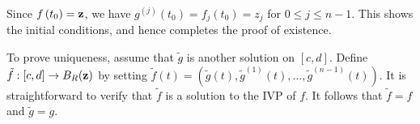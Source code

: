 \documentclass[a4paper]{article}
\begin{document}
Since $f\left(t_0\right)={\bf z}$, we have $g^{(j)}\left(t_0\right)=f_j\left(t_0\right)=z_j$ for $0 \leqslant j \leqslant n-1$. This shows the initial conditions, and hence completes the proof of existence.

To prove uniqueness, assume that $\tilde{g}$ is another solution on $[c, d]$. Define $\tilde{f}:[c, d] \rightarrow B_R({\bf z})$ by setting $\tilde{f}(t)=\left(\tilde{g}(t), \tilde{g}^{(1)}(t), \ldots, \tilde{g}^{(n-1)}(t)\right)$. It is straightforward to verify that $\tilde{f}$ is a solution to the IVP of $f$. It follows that $\tilde{f}=f$ and $\tilde{g}=g$.
\end{document}
